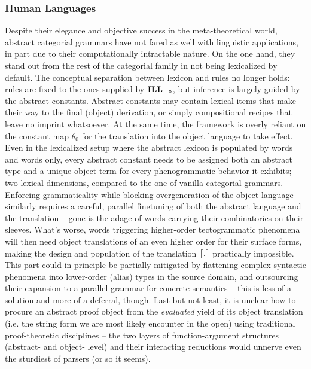 \subsubsection{Human Languages}
Despite their elegance and objective success in the meta-theoretical world, abstract categorial grammars have not fared as well with linguistic applications, in part due to their computationally intractable nature.
On the one hand, they stand out from the rest of the categorial family in not being lexicalized by default.
The conceptual separation between lexicon and rules no longer holds: rules are fixed to the ones supplied by $\ILL_{\li}$, but inference is largely guided by the abstract constants.
Abstract constants may contain lexical items that make their way to the final (object) derivation, or simply compositional recipes that leave no imprint whatsoever.
At the same time, the framework is overly reliant on the constant map $\theta_0$ for the translation into the object language to take effect.
Even in the lexicalized setup where the abstract lexicon is populated by words and words only, every abstract constant needs to be assigned both an abstract type and a unique object term for every phenogrammatic behavior it exhibits; two lexical dimensions, compared to the one of vanilla categorial grammars.
Enforcing grammaticality while blocking overgeneration of the object language similarly requires a careful, parallel finetuning of both the abstract language and the translation --  gone is the adage of words carrying their combinatorics on their sleeves. 
What's worse, words triggering higher-order tectogrammatic phenomena will then need object translations of an even higher order for their surface forms, making the design and population of the translation $\lceil{.}\rceil$ practically impossible.
This part could in principle be partially mitigated by flattening complex syntactic phenomena into lower-order (alias) types in the source domain, and outsourcing their expansion to a parallel grammar for concrete semantics -- this is less of a solution and more of a deferral, though.
Last but not least, it is unclear how to procure an abstract proof object from the \textit{evaluated} yield of its object translation (i.e. the string form we are most likely encounter in the open) using traditional proof-theoretic disciplines -- the two layers of function-argument structures (abstract- and object- level) and their interacting reductions would unnerve even the sturdiest of parsers (or so it seems).

